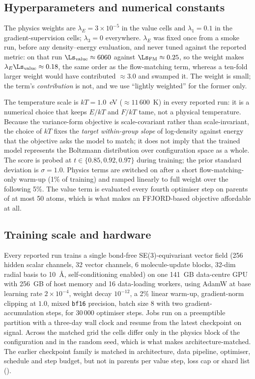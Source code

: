 \subsection{Hyperparameters and numerical constants}
\label{app:hyper}
\label{app:constants}



The physics weights are $\lambda_E = 3\times 10^{-5}$ in the value cells and
$\lambda_1 = 0.1$ in the gradient-supervision cells; $\lambda_3 = 0$ everywhere.
$\lambda_E$ was fixed once from a smoke run, before any density--energy evaluation,
and never tuned against the reported metric: on that run
$\Ls_{\mathrm{value}} \approx 6060$ against $\Ls_{\mathrm{FM}} \approx 0.25$, so the
weight makes $\lambda_E\Ls_{\mathrm{value}} \approx 0.18$, the same order as the
flow-matching term, whereas a ten-fold larger weight would have contributed
$\approx 3.0$ and swamped it. The weight is small; the term's \emph{contribution}
is not, and we use ``lightly weighted'' for the former only.

The temperature scale is $kT = 1.0$~eV ($\approx 11\,600$~K) in every reported
run: it is a numerical choice that keeps $E/kT$ and $F/kT$ tame, not a physical
temperature. Because the variance-form objective is scale-covariant rather than
scale-invariant, the choice of $kT$ fixes the \emph{target within-group slope} of
log-density against energy that the objective asks the model to match; it does not
imply that the trained model represents the Boltzmann distribution over configuration
space as a whole. The score is probed at $t \in \{0.85, 0.92, 0.97\}$ during training; the
prior standard deviation is $\sigma = 1.0$. Physics terms are switched on after a
short flow-matching-only warm-up (1\% of training) and ramped linearly to full
weight over the following 5\%. The value term is evaluated every fourth optimiser
step on parents of at most 50 atoms, which is what makes an FFJORD-based objective
affordable at all.

\subsection{Training scale and hardware}
\label{app:hardware}

Every reported run trains a single bond-free SE(3)-equivariant vector field
(256 hidden scalar channels, 32 vector channels, 6 molecule-update blocks, 32-dim
radial basis to 10~\AA, self-conditioning enabled) on one 141~GB data-centre GPU
with 256~GB of host memory and 16 data-loading workers, using AdamW at base
learning rate $2\times 10^{-4}$, weight decay $10^{-12}$, a 2\% linear warm-up,
gradient-norm clipping at $1.0$, mixed \texttt{bf16} precision, batch size 8 with
two gradient-accumulation steps, for $30\,000$ optimiser steps. Jobs run on a
preemptible partition with a three-day wall clock and resume from the latest
checkpoint on signal. Across the matched grid the cells differ only in the physics
block of the configuration and in the random seed, which is what makes
 architecture-matched. The earlier checkpoint family is matched in
architecture, data pipeline, optimiser, schedule and step budget, but not in
parents per value step, loss cap or shard list ().

